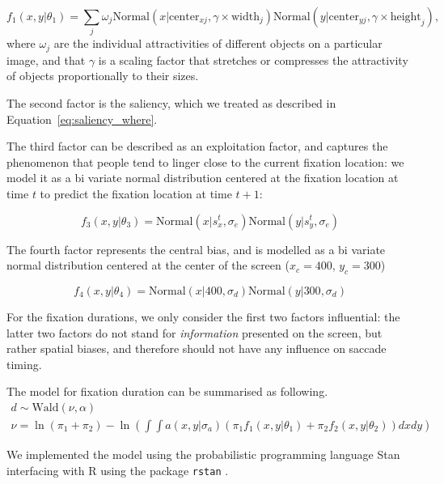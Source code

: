 \documentclass{article}
\begin{document}
\begin{equation}
    f_1(x, y | \theta_1) = \sum_j \omega_j \text{Normal}(x | \text{center}_{xj}, \gamma \times \text{width}_{j}) \text{Normal}(y | \text{center}_{yj}, \gamma \times\text{height}_{j}), 
\end{equation}
where $\omega_j$ are the individual attractivities of different objects on a particular image, and that $\gamma$ is a scaling factor that stretches or compresses the attractivity of objects proportionally to their sizes.

The second factor is the saliency, which we treated as described in Equation~\ref{eq:saliency_where}.

The third factor can be described as an exploitation factor, and captures the phenomenon that people tend to linger close to the current fixation location: we model it as a bi variate normal distribution centered at the fixation location at time $t$ to predict the fixation location at time $t+1$:

\begin{equation}
    f_3(x, y|\theta_3) = \text{Normal}(x | s_x^t, \sigma_e) \text{Normal}(y | s_y^t, \sigma_e)
\end{equation}

The fourth factor represents the central bias, and is modelled as a bi variate normal distribution centered at the center of the screen ($x_c = 400$, $y_c = 300$)

\begin{equation}
    f_4(x, y|\theta_4) = \text{Normal}(x | 400, \sigma_d) \text{Normal}(y | 300, \sigma_d)
\end{equation}

For the fixation durations, we only consider the first two factors influential: the latter two factors do not stand for \textit{information} presented on the screen, but rather spatial biases, and therefore should not have any influence on saccade timing.

The model for fixation duration can be summarised as following.
\begin{gather*}
    d \sim \text{Wald}(\nu, \alpha) \\
    \nu = \ln(\pi_1 + \pi_2) - \ln\left(\int\int a(x, y | \sigma_a) \left(\pi_1 f_1(x, y | \theta_1) + \pi_2 f_2(x, y | \theta_2)\right)dxdy\right)
\end{gather*}


We implemented the model using the probabilistic programming language Stan \citep{carpenter2017stan} interfacing with R \citep{citeR} using the package \texttt{rstan} \citep{team2020rstan}.
\end{document}
